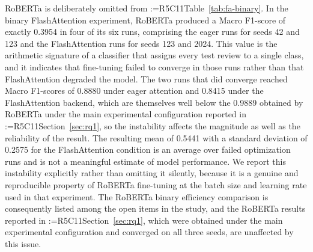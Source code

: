\documentclass[a4paper,fleqn]{cas-sc}
\makeatletter
\newif\iftracked
\newcommand{\rv@setcolour}[1]{%
  \IfStrEq{#1}{R7C7}{\color{rvEdit}}{%
    \IfSubStr{#1}{R5}{\IfSubStr{#1}{R7}{\color{rvBoth}}{\color{rvFive}}}{\color{rvSeven}}}}
\newcommand{\rv@tag}[1]{\textsuperscript{\sffamily\bfseries\scriptsize[\StrSubstitute{#1}{,}{, }]}\,}
\newcommand{\rv@recordone}[1]{%
  \edef\rv@i{#1}%
  \ifcsdef{rv@n@\rv@i}{}{\csgdef{rv@n@\rv@i}{0}}%
  \csxdef{rv@n@\rv@i}{\the\numexpr\csuse{rv@n@\rv@i}+1\relax}%
  \begingroup\edef\@currentlabel{\rv@i}\label{rv:\rv@i:\csuse{rv@n@\rv@i}}\endgroup}
\newcommand{\rv@record}[1]{\@for\rv@id:=#1\do{\expandafter\rv@recordone\expandafter{\rv@id}}}
\DeclareRobustCommand{\rcrep}[3]{\rv@record{#1}\iftracked{\rv@setcolour{#1}\rv@tag{#1}\rv@strike{#2} #3}\else#3\fi}
\makeatother
\begin{document}
RoBERTa is deliberately omitted from \rcrep{R5C11}{Table 11}{Table~\ref{tab:fa-binary}}. In the binary FlashAttention experiment, RoBERTa produced a Macro F1-score of exactly 0.3954 in four of its six runs, comprising the eager runs for seeds 42 and 123 and the FlashAttention runs for seeds 123 and 2024. This value is the arithmetic signature of a classifier that assigns every test review to a single class, and it indicates that fine-tuning failed to converge in those runs rather than that FlashAttention degraded the model. The two runs that did converge reached Macro F1-scores of 0.8880 under eager attention and 0.8415 under the FlashAttention backend, which are themselves well below the 0.9889 obtained by RoBERTa under the main experimental configuration reported in \rcrep{R5C11}{Section 6}{Section~\ref{sec:rq1}}, so the instability affects the magnitude as well as the reliability of the result. The resulting mean of 0.5441 with a standard deviation of 0.2575 for the FlashAttention condition is an average over failed optimization runs and is not a meaningful estimate of model performance. We report this instability explicitly rather than omitting it silently, because it is a genuine and reproducible property of RoBERTa fine-tuning at the batch size and learning rate used in that experiment. The RoBERTa binary efficiency comparison is consequently listed among the open items in the study, and the RoBERTa results reported in \rcrep{R5C11}{Section 6}{Section~\ref{sec:rq1}}, which were obtained under the main experimental configuration and converged on all three seeds, are unaffected by this issue.
\end{document}
